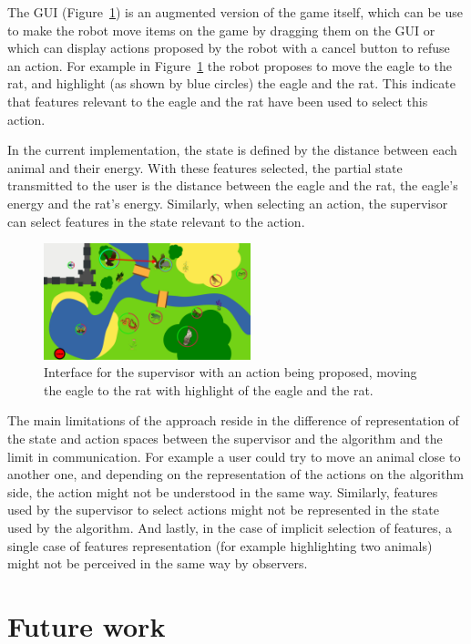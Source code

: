 \documentclass[letterpaper]{article} %
\begin{document}
The GUI (Figure~\ref{fig:gui}) is an augmented version of the game itself, which
can be use to make the robot move items on the game by dragging them on the GUI
or which can display actions proposed by the robot with a cancel button to
refuse an action. For example in Figure~\ref{fig:gui} the robot proposes to move
the eagle to the rat, and highlight (as shown by blue circles) the eagle and the
rat. This indicate that features relevant to the eagle and the rat have been
used to select this action.

In the current implementation, the state is defined by the distance between each
animal and their energy. With these features selected, the partial state
transmitted to the user is the distance between the eagle and the rat, the
eagle's energy and
the rat's energy. Similarly, when selecting an action, the supervisor can 
select features in the state relevant to the action.

\begin{figure}
        \centering
    \includegraphics[width=60mm]{./figs/proposition.png}
    \caption{Interface for the supervisor with an action being proposed, moving
        the eagle to the rat with highlight of the eagle and the rat.}
        \label{fig:gui}
\end{figure}


The main limitations of the approach reside in the difference of
representation of the state and action spaces between the supervisor and the
algorithm and the limit in communication. For example a user could try to move
an animal close to another one,
and depending on the representation of the actions on the algorithm side, the
action might not be understood in the same way. Similarly, features used by the
supervisor to select actions might not be represented in the state used by the
algorithm. And lastly, in the case of implicit selection of features, a single
case of features representation (for example highlighting two animals) might not
be perceived in the same way by observers.


\section{Future work}
\end{document}
